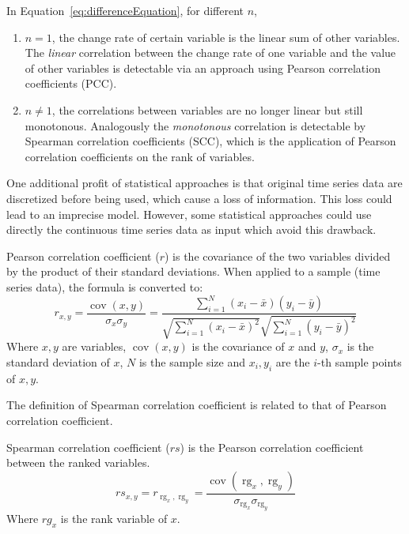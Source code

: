 In Equation~\ref{eq:differenceEquation}, for different $n$,
\begin{enumerate}
    \item $n=1$, the change rate of certain variable is the linear sum of other variables.
    The \textit{linear} correlation between the change rate of one variable and the value of other variables is detectable via an approach using Pearson correlation coefficients (PCC).
    \item $n\neq 1$, the correlations between variables are no longer linear but still monotonous.
    Analogously the \textit{monotonous} correlation is detectable by Spearman correlation coefficients (SCC), which is the application of Pearson correlation coefficients on the rank of variables.
\end{enumerate}

One additional profit of statistical approaches is that original time series data are discretized before being used, which cause a loss of information.
This loss could lead to an imprecise model.
However, some statistical approaches could use directly the continuous time series data as input which avoid this drawback.

\begin{definition}
    Pearson correlation coefficient ($r$) is the covariance of the two variables divided by the product of their standard deviations.
    When applied to a sample (time series data), the formula is converted to:
    $${\displaystyle r_{x,y}={\frac {\operatorname {cov} (x,y)}{\sigma _{x}\sigma _{y}}}={\frac {\sum _{i=1}^{N}(x_{i}-{\bar {x}})(y_{i}-{\bar {y}})}{{\sqrt {\sum _{i=1}^{N}(x_{i}-{\bar {x}})^{2}}}{\sqrt {\sum _{i=1}^{N}(y_{i}-{\bar {y}})^{2}}}}}}$$
    Where $x,y$ are variables, $\operatorname {cov} (x,y)$ is the covariance of $x$ and $y$, $\sigma _{x}$ is the standard deviation of $x$, $N$ is the sample size and $x_i,y_i$ are the $i$-th sample points of $x,y$.
\end{definition}

The definition of Spearman correlation coefficient is related to that of Pearson correlation coefficient.

\begin{definition}
    Spearman correlation coefficient ($rs$) is the Pearson correlation coefficient between the ranked variables.
    $${\displaystyle rs_{x,y}=r_{\operatorname {rg} _{x},\operatorname {rg} _{y}}={\frac {\operatorname {cov} (\operatorname {rg} _{x},\operatorname {rg} _{y})}{\sigma _{\operatorname {rg} _{x}}\sigma _{\operatorname {rg} _{y}}}}}$$
    Where $rg_x$ is the rank variable of $x$.
\end{definition}

